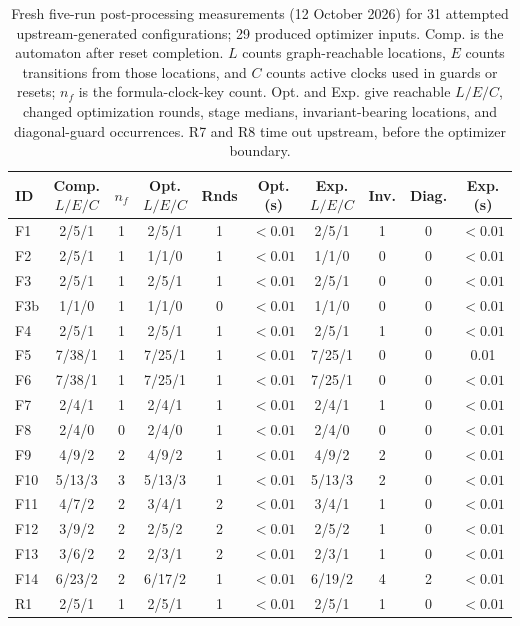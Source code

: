 \begin{table}[t]
\centering
\caption{Fresh five-run post-processing measurements (12 October 2026) for 31 attempted upstream-generated configurations; 29 produced optimizer inputs. Comp. is the automaton after reset completion. $L$ counts graph-reachable locations, $E$ counts transitions from those locations, and $C$ counts active clocks used in guards or resets; $n_f$ is the formula-clock-key count. Opt. and Exp. give reachable $L/E/C$, changed optimization rounds, stage medians, invariant-bearing locations, and diagonal-guard occurrences. R7 and R8 time out upstream, before the optimizer boundary.}
\label{tab:optimizer-benchmarks}
\scriptsize
\setlength{\tabcolsep}{3pt}
\begin{tabular}{@{}lccccccccc@{}}
\toprule
ID & Comp. $L/E/C$ & $n_f$ & Opt. $L/E/C$ & Rnds & Opt. (s) & Exp. $L/E/C$ & Inv. & Diag. & Exp. (s)\\
\midrule
F1 & 2/5/1 & 1 & 2/5/1 & 1 & $<0.01$ & 2/5/1 & 1 & 0 & $<0.01$\\
F2 & 2/5/1 & 1 & 1/1/0 & 1 & $<0.01$ & 1/1/0 & 0 & 0 & $<0.01$\\
F3 & 2/5/1 & 1 & 2/5/1 & 1 & $<0.01$ & 2/5/1 & 0 & 0 & $<0.01$\\
F3b & 1/1/0 & 1 & 1/1/0 & 0 & $<0.01$ & 1/1/0 & 0 & 0 & $<0.01$\\
F4 & 2/5/1 & 1 & 2/5/1 & 1 & $<0.01$ & 2/5/1 & 1 & 0 & $<0.01$\\
F5 & 7/38/1 & 1 & 7/25/1 & 1 & $<0.01$ & 7/25/1 & 0 & 0 & 0.01\\
F6 & 7/38/1 & 1 & 7/25/1 & 1 & $<0.01$ & 7/25/1 & 0 & 0 & $<0.01$\\
F7 & 2/4/1 & 1 & 2/4/1 & 1 & $<0.01$ & 2/4/1 & 1 & 0 & $<0.01$\\
F8 & 2/4/0 & 0 & 2/4/0 & 1 & $<0.01$ & 2/4/0 & 0 & 0 & $<0.01$\\
F9 & 4/9/2 & 2 & 4/9/2 & 1 & $<0.01$ & 4/9/2 & 2 & 0 & $<0.01$\\
F10 & 5/13/3 & 3 & 5/13/3 & 1 & $<0.01$ & 5/13/3 & 2 & 0 & $<0.01$\\
F11 & 4/7/2 & 2 & 3/4/1 & 2 & $<0.01$ & 3/4/1 & 1 & 0 & $<0.01$\\
F12 & 3/9/2 & 2 & 2/5/2 & 2 & $<0.01$ & 2/5/2 & 1 & 0 & $<0.01$\\
F13 & 3/6/2 & 2 & 2/3/1 & 2 & $<0.01$ & 2/3/1 & 1 & 0 & $<0.01$\\
F14 & 6/23/2 & 2 & 6/17/2 & 1 & $<0.01$ & 6/19/2 & 4 & 2 & $<0.01$\\
R1 & 2/5/1 & 1 & 2/5/1 & 1 & $<0.01$ & 2/5/1 & 1 & 0 & $<0.01$\\

\end{tabular}
\end{table}
